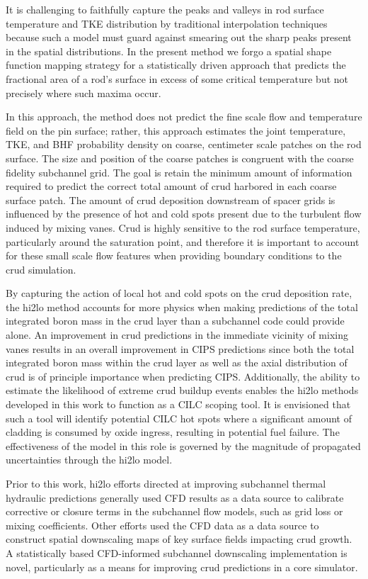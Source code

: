 It is challenging to faithfully capture the peaks and valleys in
rod surface temperature and TKE distribution by traditional interpolation
techniques because such a model must guard against smearing out the sharp peaks
present in the spatial distributions.
In the present method we forgo a spatial shape function mapping strategy
for a statistically driven approach that predicts the fractional
area of a rod's surface in excess of some critical temperature but not
precisely where such maxima occur.

In this approach, the method does not predict the fine scale flow and temperature field on the pin surface; rather, this approach estimates the joint temperature, TKE, and BHF probability density on coarse, centimeter scale patches on the rod surface.  The size and position of the coarse patches is congruent with the coarse fidelity subchannel grid.  The goal is retain the minimum amount of information required to predict the correct total amount of crud harbored in each coarse surface patch.  The amount of crud deposition downstream of spacer grids is influenced by the presence of hot and cold spots present due to the turbulent flow induced by mixing vanes.  Crud is highly sensitive to the rod surface temperature, particularly around the saturation point, and therefore it is important to account for these small scale flow features when providing boundary conditions to the crud simulation.

By capturing the action of local hot and cold spots on the crud deposition rate, the hi2lo method accounts for more physics when making predictions of the total integrated boron mass in the crud layer than a subchannel code could provide alone.  An improvement in crud predictions in the immediate vicinity of mixing vanes results in an overall improvement in CIPS predictions since both the total integrated boron mass within the crud layer as well as the axial distribution of crud is of principle importance when predicting CIPS.  Additionally, the ability to estimate the likelihood of extreme crud buildup events enables the hi2lo methods developed in this work to function as a CILC scoping tool.  It is envisioned that such a tool will identify potential CILC hot spots where a significant amount of cladding is consumed by oxide ingress, resulting in potential fuel failure.  The effectiveness of the model in this role is governed by the magnitude of propagated uncertainties through the hi2lo model.

Prior to this work, hi2lo efforts directed at improving subchannel thermal hydraulic predictions generally used CFD results as a data source to calibrate corrective or closure terms in the subchannel flow models, such as grid loss or mixing coefficients.  Other efforts used the CFD data as a data source to construct spatial downscaling maps of key surface fields impacting crud growth.  A statistically based CFD-informed subchannel downscaling implementation is novel, particularly as a means for improving crud predictions in a core simulator.


